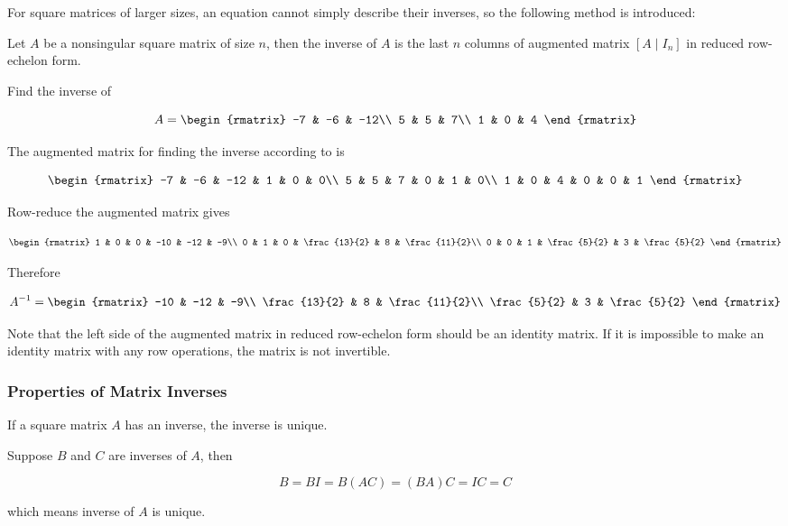 \documentclass[a4paper,12pt]{article}
\begin{document}
For square matrices of larger sizes, an equation cannot simply describe their inverses, so the following method is introduced:

\begin{thm}
  Let $A$ be a nonsingular square matrix of size $n$, then the inverse of $A$ is the last $n$ columns of augmented matrix $[A\!\mid\!I_{n}]$ in reduced row-echelon form.
\end{thm}\n

\begin{exm}
  Find the inverse of

  $$A=\begin{rmatrix}
    -7 & -6 & -12\\
    5 & 5 & 7\\
    1 & 0 & 4
  \end{rmatrix}$$\s

  The augmented matrix for finding the inverse according to \rthm[\sctd{1}] is

  $$\begin{rmatrix}
    -7 & -6 & -12 & 1 & 0 & 0\\
    5 & 5 & 7 & 0 & 1 & 0\\
    1 & 0 & 4 & 0 & 0 & 1
  \end{rmatrix}$$\s

  Row-reduce the augmented matrix gives

  $$\begin{rmatrix}
    1 & 0 & 0 & -10 & -12 & -9\\
    0 & 1 & 0 & \frac{13}{2} & 8 & \frac{11}{2}\\
    0 & 0 & 1 & \frac{5}{2} & 3 & \frac{5}{2}
  \end{rmatrix}$$\s

  Therefore

  $$A^{-1}=\begin{rmatrix}
    -10 & -12 & -9\\
    \frac{13}{2} & 8 & \frac{11}{2}\\
    \frac{5}{2} & 3 & \frac{5}{2}
  \end{rmatrix}$$
\end{exm}\n

Note that the left side of the augmented matrix in reduced row-echelon form should be an identity matrix. If it is impossible to make an identity matrix with any row operations, the matrix is not invertible.

\subsubsection{Properties of Matrix Inverses}
\begin{pst}
  If a square matrix $A$ has an inverse, the inverse is unique.\n

  \prf Suppose $B$ and $C$ are inverses of $A$, then

  $$B=BI=B(AC)=(BA)C=IC=C$$\s

  which means inverse of $A$ is unique.
\end{pst}\n
\end{document}
